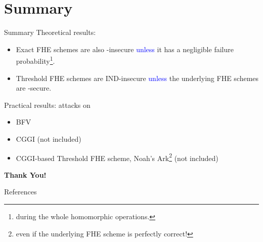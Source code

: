 \documentclass[handout]{beamer}
\begin{document}
 \section{Summary}
    \begin{frame}{Summary}
    \small
    Theoretical results: 
    \begin{itemize}
        \item Exact FHE schemes are also \indcpad-insecure \textcolor{blue}{unless} it has a negligible failure probability\footnote{during the whole homomorphic operations.}.\pause
        \item Threshold FHE schemes are IND-insecure \textcolor{blue}{unless} the underlying FHE schemes are \indcpad-secure. 
    \end{itemize}\vspace{0.3cm}\pause
    
    Practical results: \krd attacks on
        \begin{itemize}
            \item BFV\pause
            \item CGGI (not included)
            \item CGGI-based Threshold FHE scheme, {Noah's Ark}\footnote{even if the underlying FHE scheme is perfectly correct!} (not included)
        \end{itemize}\vspace{0.5cm}
    \end{frame}
    
    \begin{frame}{}
    \begin{center}
        {\Huge\bf Thank You!}
    \end{center}
    \end{frame}
    
    \begin{frame}{References}
    
    
    
    
    \end{frame}
\end{document}
